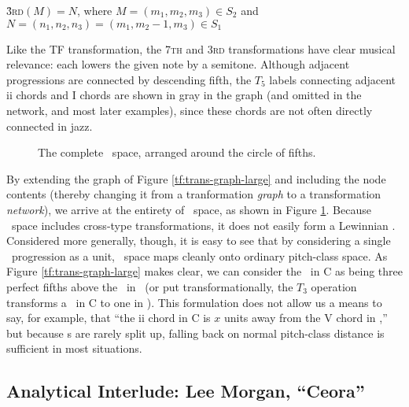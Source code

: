 \h{3}\textsc{rd}$(M) = N$, where $M = (m_1, m_2, m_3) \in S_2$ and $N=(n_1, n_2,
n_3)=(m_1, m_2-1, m_3) \in S_1$
\vspace{0.5\baselineskip}

\noindent Like the TF transformation, the \textsc{7th} and \textsc{3rd}
transformations have clear musical relevance: each lowers the given note by a
semitone. Although adjacent progressions are connected by descending fifth,
the $T_5$ labels connecting adjacent ii chords and I chords
are shown in gray in the graph (and omitted in the network, and most later
examples), since these chords are not often directly connected in jazz.

\begin{figure}[thb]
  \caption{The complete \tf\ space, arranged around the circle of fifths.}
  \label{tf:tf-circle-fifths}
\end{figure}

By extending the graph of Figure \ref{tf:trans-graph-large} and including the
node contents (thereby changing it from a tranformation \emph{graph} to a
transformation \emph{network}), we arrive at the entirety of \tf\ space, as
shown in Figure \ref{tf:tf-circle-fifths}. Because \tf\ space includes
cross-type transformations, it does not easily form a Lewinnian \gis.
Considered more generally, though, it is easy to see that by considering a
single \tfo\ progression as a unit, \tf\ space maps cleanly onto ordinary
pitch-class space.  As Figure \ref{tf:trans-graph-large} makes clear, we can
consider the \tfo\ in C as being three perfect fifths above the \tfo\ in
\Eflat\ (or put transformationally, the $T_3$ operation transforms a \tfo\ in
C to one in \Eflat). This formulation does not allow us a means to say, for
example, that “the ii chord in C is $x$ units away from the V chord in
\Eflat,” but because \tfo{}s are rarely split up, falling back on normal
pitch-class distance is sufficient in most situations.




\FloatBarrier

\subsection{Analytical Interlude: Lee Morgan, “Ceora”}

